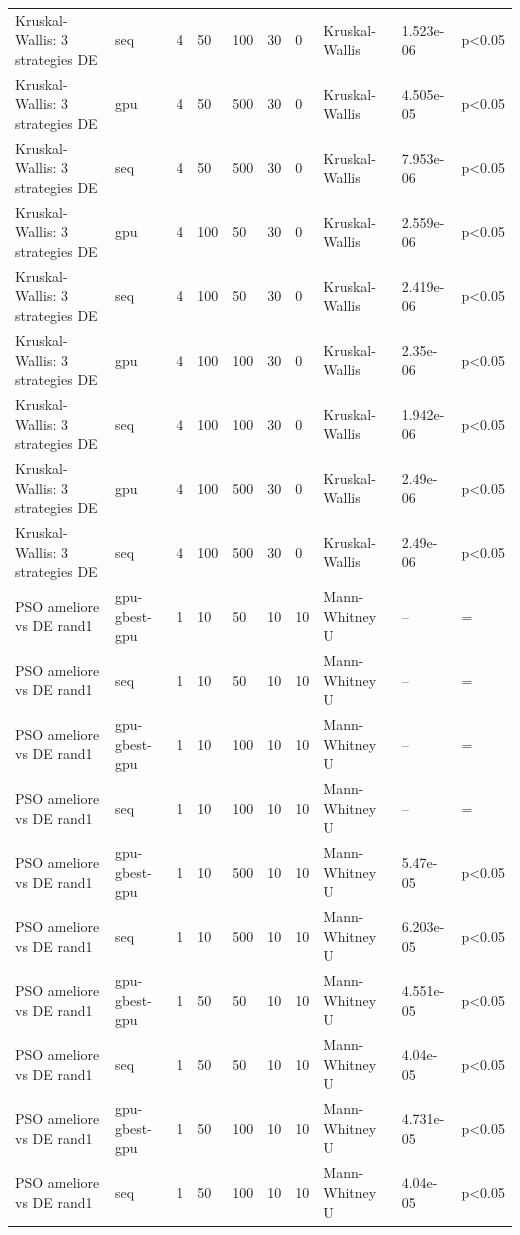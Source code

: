 \begin{table}[t]
\begin{tabular}{llllllllll}
Kruskal-Wallis: 3 strategies DE & seq & 4 & 50 & 100 & 30 & 0 & Kruskal-Wallis & 1.523e-06 & p<0.05 \\
Kruskal-Wallis: 3 strategies DE & gpu & 4 & 50 & 500 & 30 & 0 & Kruskal-Wallis & 4.505e-05 & p<0.05 \\
Kruskal-Wallis: 3 strategies DE & seq & 4 & 50 & 500 & 30 & 0 & Kruskal-Wallis & 7.953e-06 & p<0.05 \\
Kruskal-Wallis: 3 strategies DE & gpu & 4 & 100 & 50 & 30 & 0 & Kruskal-Wallis & 2.559e-06 & p<0.05 \\
Kruskal-Wallis: 3 strategies DE & seq & 4 & 100 & 50 & 30 & 0 & Kruskal-Wallis & 2.419e-06 & p<0.05 \\
Kruskal-Wallis: 3 strategies DE & gpu & 4 & 100 & 100 & 30 & 0 & Kruskal-Wallis & 2.35e-06 & p<0.05 \\
Kruskal-Wallis: 3 strategies DE & seq & 4 & 100 & 100 & 30 & 0 & Kruskal-Wallis & 1.942e-06 & p<0.05 \\
Kruskal-Wallis: 3 strategies DE & gpu & 4 & 100 & 500 & 30 & 0 & Kruskal-Wallis & 2.49e-06 & p<0.05 \\
Kruskal-Wallis: 3 strategies DE & seq & 4 & 100 & 500 & 30 & 0 & Kruskal-Wallis & 2.49e-06 & p<0.05 \\
PSO ameliore vs DE rand1 & gpu-gbest-gpu & 1 & 10 & 50 & 10 & 10 & Mann-Whitney U & -- & = \\
PSO ameliore vs DE rand1 & seq & 1 & 10 & 50 & 10 & 10 & Mann-Whitney U & -- & = \\
PSO ameliore vs DE rand1 & gpu-gbest-gpu & 1 & 10 & 100 & 10 & 10 & Mann-Whitney U & -- & = \\
PSO ameliore vs DE rand1 & seq & 1 & 10 & 100 & 10 & 10 & Mann-Whitney U & -- & = \\
PSO ameliore vs DE rand1 & gpu-gbest-gpu & 1 & 10 & 500 & 10 & 10 & Mann-Whitney U & 5.47e-05 & p<0.05 \\
PSO ameliore vs DE rand1 & seq & 1 & 10 & 500 & 10 & 10 & Mann-Whitney U & 6.203e-05 & p<0.05 \\
PSO ameliore vs DE rand1 & gpu-gbest-gpu & 1 & 50 & 50 & 10 & 10 & Mann-Whitney U & 4.551e-05 & p<0.05 \\
PSO ameliore vs DE rand1 & seq & 1 & 50 & 50 & 10 & 10 & Mann-Whitney U & 4.04e-05 & p<0.05 \\
PSO ameliore vs DE rand1 & gpu-gbest-gpu & 1 & 50 & 100 & 10 & 10 & Mann-Whitney U & 4.731e-05 & p<0.05 \\
PSO ameliore vs DE rand1 & seq & 1 & 50 & 100 & 10 & 10 & Mann-Whitney U & 4.04e-05 & p<0.05 \\

\end{tabular}
\end{table}
